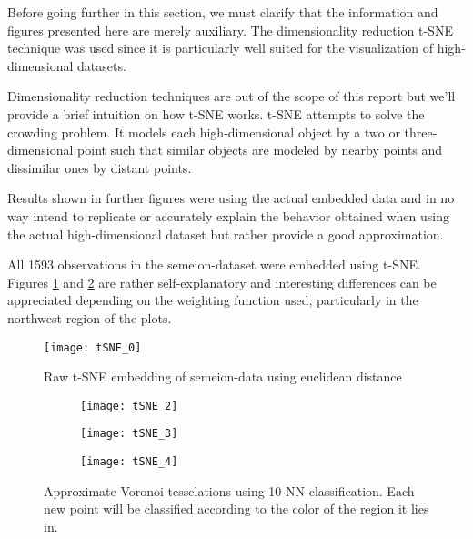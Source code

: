 Before going further in this section, we must clarify that the information and figures presented here are merely auxiliary. The dimensionality reduction t-SNE technique was used since it is particularly well suited for the visualization of high-dimensional datasets.

Dimensionality reduction techniques are out of the scope of this report but we'll provide a brief intuition on how t-SNE works. t-SNE attempts to solve the crowding problem. It models each high-dimensional object by a two or three-dimensional point such that similar objects are modeled by nearby points and dissimilar ones by distant points.

Results shown in further figures were using the actual embedded data and in no way intend to replicate or accurately explain the behavior obtained when using the actual high-dimensional dataset but rather provide a good approximation.

All 1593 observations in the semeion-dataset were embedded using t-SNE. Figures \ref{fig:tSNE_0} and \ref{fig:tSNE_234} are rather self-explanatory and interesting differences can be appreciated depending on the weighting function used, particularly in the northwest region of the plots.
\begin{figure}[b]
	\centering
	\texttt{[image: tSNE\_0]}
	\caption{Raw t-SNE embedding of semeion-data using euclidean distance}
	\label{fig:tSNE_0}
\end{figure}
\begin{figure}[]
	\centering
	\begin{subfigure}[]{0.45\textwidth}
		\centering
		\texttt{[image: tSNE\_2]}
	\end{subfigure}
	\begin{subfigure}[]{0.45\textwidth}
		\centering
		\texttt{[image: tSNE\_3]}
	\end{subfigure}
	\begin{subfigure}[]{0.45\textwidth}
		\centering
		\texttt{[image: tSNE\_4]}
	\end{subfigure}
	\caption{Approximate Voronoi tesselations using 10-NN classification. Each new point will be classified according to the color of the region it lies in.}
	\label{fig:tSNE_234}
\end{figure}
